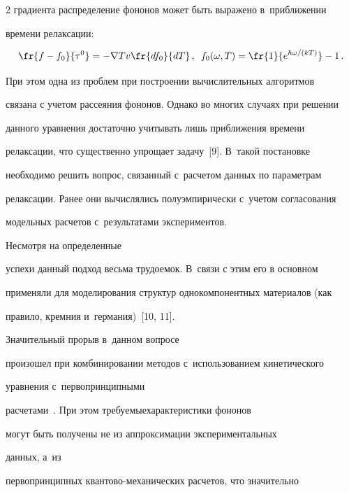 \begin{multicols}{2}
градиента распределение фононов может быть выражено в~приближении 


времени релаксации:


    \begin{equation*}


    \fr{f-f_0}{\tau^0}=-\nabla T v \fr{df_0}{dT}\,,\enskip


    f_0(\omega, T)=\fr{1}{e^{\hbar\omega/(kT)}}-1\,.


    \end{equation*}




    При этом одна из проблем при построении вычислительных алгоритмов 


связана с учетом рассеяния фононов. Однако во многих случаях при решении 


данного уравнения достаточно учитывать лишь приближения времени 


релаксации, что существенно упрощает задачу~[9]. В~такой постановке 


необходимо решить вопрос, связанный с~расчетом данных по параметрам 


релаксации. Ранее они вычислялись полуэмпирически с~учетом согласования 


модельных расчетов с~результатами экспериментов. 





Несмотря на определенные 


успехи данный подход весьма трудоемок. В~связи с этим его в основном 


применяли для моделирования структур однокомпонентных материалов (как 


правило, кремния и~германия)~[10, 11]. 





Значительный прорыв в~данном вопросе 


произошел при комбинировании методов с~использованием кинетического 


уравнения с~первопринципными  


расчетами~\cite{8-ab, 9-ab, 12-ab}. При этом требуемые\linebreak \mbox{характеристики} фононов 


могут быть получены не из аппроксимации экспериментальных %


 данных, а~из 


первопринципных кван\-то\-во-ме\-ха\-ни\-че\-ских расчетов, что значительно 



\end{multicols}
